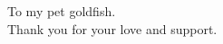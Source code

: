 \documentclass[crop=false,12pt,class=report]{standalone}
\begin{document}
\begin{center}
    To my pet goldfish.\\ Thank you for your love and support.
\end{center}

\setcounter{page}{4}
\end{document}
